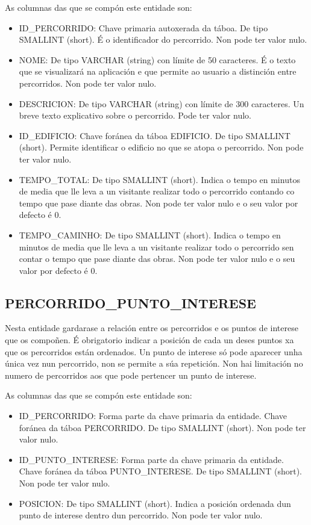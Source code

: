 As columnas das que se compón este entidade son:
\begin{itemize}
	\item ID\_PERCORRIDO: Chave primaria autoxerada da táboa. De tipo SMALLINT (short). É o identificador do percorrido. Non pode ter valor nulo.
	\item NOME: De tipo VARCHAR (string) con límite de 50 caracteres. É o texto que se visualizará na aplicación e que permite ao usuario a distinción entre percorridos. Non pode ter valor nulo.
	\item DESCRICION: De tipo VARCHAR (string) con límite de 300 caracteres. Un breve texto explicativo sobre o percorrido. Pode ter valor nulo.
	\item ID\_EDIFICIO: Chave foránea da táboa EDIFICIO. De tipo SMALLINT (short). Permite identificar o edificio no que se atopa o percorrido. Non pode ter valor nulo.
	\item TEMPO\_TOTAL: De tipo SMALLINT (short). Indica o tempo en minutos de media que lle leva a un visitante realizar todo o percorrido contando co tempo que pase diante das obras. Non pode ter valor nulo e o seu valor por defecto é 0.
	\item TEMPO\_CAMINHO: De tipo SMALLINT (short). Indica o tempo en minutos de media que lle leva a un visitante realizar todo o percorrido sen contar o tempo que pase diante das obras. Non pode ter valor nulo e o seu valor por defecto é 0.
\end{itemize}


\subsection{PERCORRIDO\_PUNTO\_INTERESE}
Nesta entidade gardarase a relación entre os percorridos e os puntos de interese que os compoñen. É obrigatorio indicar a posición de cada un deses puntos xa que os percorridos están ordenados. Un punto de interese só pode aparecer unha única vez nun percorrido, non se permite a súa repetición. Non hai limitación no numero de percorridos aos que pode pertencer un punto de interese.

As columnas das que se compón este entidade son:
\begin{itemize}
	\item ID\_PERCORRIDO: Forma parte da chave primaria da entidade. Chave foránea da táboa PERCORRIDO. De tipo SMALLINT (short). Non pode ter valor nulo.
	\item ID\_PUNTO\_INTERESE: Forma parte da chave primaria da entidade. Chave foránea da táboa PUNTO\_INTERESE. De tipo SMALLINT (short). Non pode ter valor nulo.
	\item POSICION: De tipo SMALLINT (short). Indica a posición ordenada dun punto de interese dentro dun percorrido. Non pode ter valor nulo.
\end{itemize}


